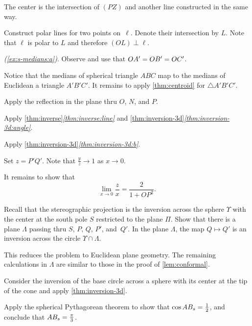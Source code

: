 The center is the intersection of $(PZ)$ and another line constructed in the same way.

Construct polar lines for two points on~$\ell$.
Denote their intersection by $L$.
Note that $\ell$ is polar to $L$ and therefore $(OL)\perp \ell$.

\setcounter{eqtn}{0}

\textit{(\ref{ex:s-medians:a})}.
Observe and use that 
$OA'=OB'=OC'$.

 Notice that the medians of spherical triangle $ABC$ 
map to the medians of Euclidean a triangle $A'B'C'$.
It remains to apply \ref{thm:centroid} for $\triangle A'B'C'$.

Apply the reflection in the plane thru $O$, $N$, and $P$.

Apply \ref{thm:inverse}\textit{\ref{thm:inverse:line}}
and \ref{thm:inversion-3d}\textit{\ref{thm:inversion-3d:angle}}.

Apply \ref{thm:inversion-3d}\textit{\ref{thm:inversion-3d:b}}.

Set $z=P'Q'$.
Note that $\tfrac yz\to 1$ as $x\to 0$.

It remains to show that 
$$\lim_{x\to 0} \frac{z}{x}=\frac{2}{1+OP^2}.$$

Recall that the stereographic projection is the inversion across the sphere $\Upsilon$ with the center at the south pole $S$ restricted to the plane $\Pi$.
Show that there is a plane $\Lambda$ passing thru $S$, $P$, $Q$, $P'$, and~$Q'$.
In the plane $\Lambda$, the map $Q\mapsto Q'$ is an inversion across the circle $\Upsilon\cap \Lambda$.

This reduces the problem to Euclidean plane geometry.
The remaining calculations in $\Lambda$ are similar to those in the proof of \ref{lem:conformal}.

Consider the inversion of the base circle across a sphere with its center at the tip of the cone and apply \ref{thm:inversion-3d}.



Apply the spherical Pythagorean theorem to show that
$
\cos AB_s=\tfrac12
$,
and conclude that $AB_s=\tfrac\pi3$.

